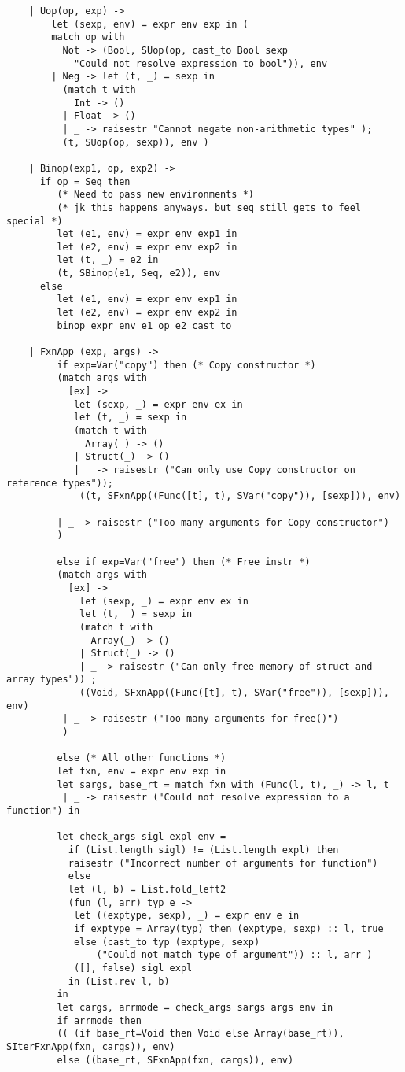\documentclass[main.tex]{subfiles}
\begin{document}
\begin{lstlisting}
    | Uop(op, exp) ->
        let (sexp, env) = expr env exp in (
        match op with
          Not -> (Bool, SUop(op, cast_to Bool sexp 
            "Could not resolve expression to bool")), env
        | Neg -> let (t, _) = sexp in
          (match t with
            Int -> ()
          | Float -> ()
          | _ -> raisestr "Cannot negate non-arithmetic types" );
          (t, SUop(op, sexp)), env )

    | Binop(exp1, op, exp2) -> 
      if op = Seq then
         (* Need to pass new environments *)
         (* jk this happens anyways. but seq still gets to feel special *)
         let (e1, env) = expr env exp1 in
         let (e2, env) = expr env exp2 in
         let (t, _) = e2 in
         (t, SBinop(e1, Seq, e2)), env
      else
         let (e1, env) = expr env exp1 in
         let (e2, env) = expr env exp2 in
         binop_expr env e1 op e2 cast_to

    | FxnApp (exp, args) -> 
         if exp=Var("copy") then (* Copy constructor *)
         (match args with
           [ex] ->
            let (sexp, _) = expr env ex in
            let (t, _) = sexp in
            (match t with
              Array(_) -> ()
            | Struct(_) -> ()
            | _ -> raisestr ("Can only use Copy constructor on reference types"));
             ((t, SFxnApp((Func([t], t), SVar("copy")), [sexp])), env)

         | _ -> raisestr ("Too many arguments for Copy constructor")
         )

         else if exp=Var("free") then (* Free instr *)
         (match args with
           [ex] ->
             let (sexp, _) = expr env ex in
             let (t, _) = sexp in
             (match t with
               Array(_) -> ()
             | Struct(_) -> ()
             | _ -> raisestr ("Can only free memory of struct and array types")) ;
             ((Void, SFxnApp((Func([t], t), SVar("free")), [sexp])), env)
          | _ -> raisestr ("Too many arguments for free()")
          )

         else (* All other functions *)
         let fxn, env = expr env exp in
         let sargs, base_rt = match fxn with (Func(l, t), _) -> l, t
          | _ -> raisestr ("Could not resolve expression to a function") in

         let check_args sigl expl env =
           if (List.length sigl) != (List.length expl) then
           raisestr ("Incorrect number of arguments for function")
           else
           let (l, b) = List.fold_left2 
           (fun (l, arr) typ e ->
            let ((exptype, sexp), _) = expr env e in
            if exptype = Array(typ) then (exptype, sexp) :: l, true
            else (cast_to typ (exptype, sexp) 
                ("Could not match type of argument")) :: l, arr ) 
            ([], false) sigl expl
           in (List.rev l, b)
         in
         let cargs, arrmode = check_args sargs args env in
         if arrmode then
         (( (if base_rt=Void then Void else Array(base_rt)), SIterFxnApp(fxn, cargs)), env)
         else ((base_rt, SFxnApp(fxn, cargs)), env)


\end{lstlisting}
\end{document}
